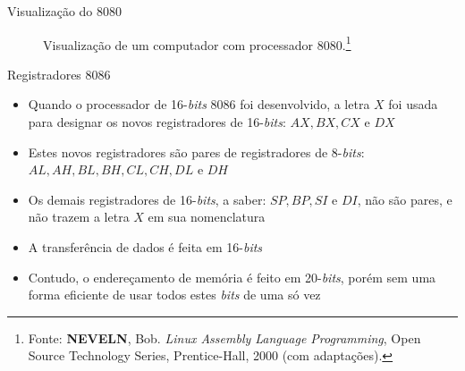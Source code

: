 \begin{frame}[fragile]{Visualização do 8080}
\begin{figure}[ht]
        \caption{Visualização de um computador com processador 8080.\footnote{Fonte: \textbf{NEVELN}, Bob. \textit{Linux Assembly Language Programming}, Open Source Technology Series, Prentice-Hall, 2000 (com adaptações).}}
    \end{figure}

\end{frame}

\begin{frame}[fragile]{Registradores 8086}

    \begin{itemize}
        \item Quando o processador de 16-\textit{bits} 8086 foi desenvolvido, a letra $X$ foi 
            usada para designar os novos registradores de 16-\textit{bits}: $AX, BX, CX$ e $DX$

        \item Estes novos registradores são pares de registradores de 8-\textit{bits}: $AL, AH,
            BL, BH, CL, CH, DL$ e $DH$

        \item Os demais registradores de 16-\textit{bits}, a saber: $SP, BP, SI$ e $DI$, não são
            pares, e não trazem a letra $X$ em sua nomenclatura

        \item A transferência de dados é feita em 16-\textit{bits}

        \item Contudo, o endereçamento de memória é feito em 20-\textit{bits}, porém sem uma
            forma eficiente de usar todos estes \textit{bits} de uma só vez
    \end{itemize}

\end{frame}

